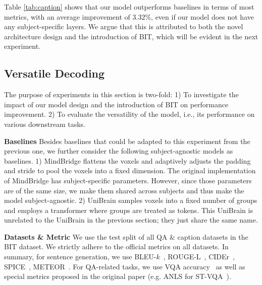 Table \ref{tab:caption} shows that our model outperforms baselines in terms of most metrics, with an average improvement of $3.32\%$, even if our model does not have any subject-specific layers. We argue that this is attributed to both the novel architecture design and the introduction of BIT, which will be evident in the next experiment.

\subsection{Versatile Decoding}
The purpose of experiments in this section is two-fold: 1) To investigate the impact of our model design and the introduction of BIT on performance improvement. 2) To evaluate the versatility of the model, i.e., its performance on various downstream tasks.

\noindent\textbf{Baselines} Besides baselines that could be adapted to this experiment from the previous one, we further consider the following subject-agnostic models as baselines.
1) MindBridge \citep{wang2024mindbridge} flattens the voxels and adaptively adjusts the padding and stride to pool the voxels into a fixed dimension. The original implementation of MindBridge has subject-specific parameters. However, since those parameters are of the same size, we make them shared across subjects and thus make the model subject-agnostic.
2) UniBrain \citep{wang2024unibrain} samples voxels into a fixed number of groups and employs a transformer where groups are treated as tokens. This UniBrain is unrelated to the UniBrain in the previous section; they just share the same name.

\noindent\textbf{Datasets \& Metric}
We use the test split of all QA \& caption datasets in the BIT dataset. We strictly adhere to the official metrics on all datasets. In summary, for sentence generation, we use BLEU-$k$~\citep{papineni2002bleu}, ROUGE-L~\citep{lin2004rouge}, CIDEr~\citep{vedantam2015cider}, SPICE~\citep{anderson2016spice}, METEOR~\citep{banerjee2005meteor}. For QA-related tasks, we use VQA accuracy~\citep{antol2015vqa} as well as special metrics proposed in the original paper (e.g. ANLS for ST-VQA~\citep{biten2019scene}).

